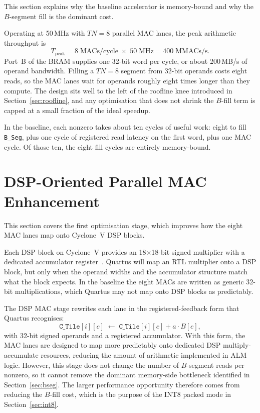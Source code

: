 This section explains why the baseline accelerator is memory-bound and why
the $B$-segment fill is the dominant cost.

Operating at 50\,MHz with $TN = 8$ parallel MAC lanes, the peak arithmetic
throughput is
\[
  T_{\mathrm{peak}} = 8 \;\text{MACs/cycle} \;\times\; 50 \;\text{MHz}
                    = 400 \;\text{MMACs/s}.
\]
Port~B of the BRAM supplies one 32-bit word per cycle, or about 200\,MB/s
of operand bandwidth. Filling a $TN = 8$ segment from 32-bit operands costs
eight reads, so the MAC lanes wait for operands roughly eight times longer
than they compute. The design sits well to the left of the roofline knee
introduced in Section~\ref{sec:roofline}, and any optimisation that does
not shrink the $B$-fill term is capped at a small fraction of the ideal
speedup.

In the baseline, each nonzero takes about ten cycles of useful work:
eight to fill \texttt{B\_Seg}, plus one cycle of registered read latency
on the first word, plus one MAC cycle. Of those ten, the eight fill cycles
are entirely memory-bound.

\section{DSP-Oriented Parallel MAC Enhancement}
\label{sec:dsp}

This section covers the first optimisation stage, which improves how the
eight MAC lanes map onto Cyclone~V DSP blocks.

Each DSP block on Cyclone~V provides an 18$\times$18-bit signed multiplier
with a dedicated accumulator register~\citep{intel_dsp_blocks}. Quartus
will map an RTL multiplier onto a DSP block, but only when the operand
widths and the accumulator structure match what the block expects. In the
baseline the eight MACs are written as generic 32-bit multiplications,
which Quartus may not map onto DSP blocks as predictably.

The DSP MAC stage rewrites each lane in the registered-feedback form that
Quartus recognises:
\[
  \texttt{C\_Tile}[i][c] \;\leftarrow\; \texttt{C\_Tile}[i][c] + a \cdot B[c],
\]
with 32-bit signed operands and a registered accumulator. With this form,
the MAC lanes are designed to map more predictably onto dedicated DSP
multiply-accumulate resources, reducing the amount of arithmetic
implemented in ALM logic. However, this stage does not change the number
of $B$-segment reads per nonzero, so it cannot remove the dominant
memory-side bottleneck identified in Section~\ref{sec:bseg}. The larger
performance opportunity therefore comes from reducing the $B$-fill cost,
which is the purpose of the INT8 packed mode in Section~\ref{sec:int8}.


